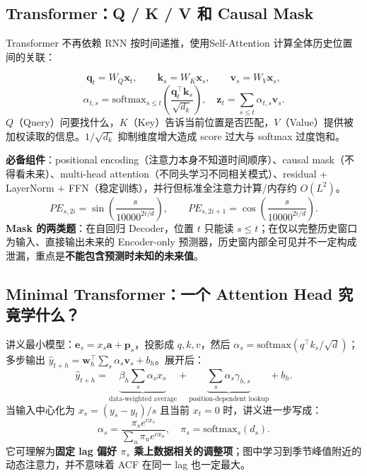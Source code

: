\documentclass[UTF8,fontset=fandol,10.5pt,a4paper]{ctexart}
\newcommand{\eng}[1]{{\sffamily\color{navy}#1}}
\newcommand{\formula}[1]{\[\boxed{#1}\]}
\begin{document}
\subsection{Transformer：Q / K / V 和 Causal Mask}
Transformer 不再依赖 RNN 按时间递推，使用\eng{Self-Attention} 计算全体历史位置间的关联：
\begin{keybox}
\[\mathbf q_t=W_Q\mathbf x_t,\qquad\mathbf k_s=W_K\mathbf x_s,\qquad\mathbf v_s=W_V\mathbf x_s,\]
\formula{\alpha_{t,s}=\mathrm{softmax}_{s\le t}\left(\frac{\mathbf q_t^\top\mathbf k_s}{\sqrt{d_k}}\right),\quad\mathbf z_t=\sum_{s\le t}\alpha_{t,s}\mathbf v_s.}
$Q$（Query）问要找什么，$K$（Key）告诉当前位置是否匹配，$V$（Value）提供被加权读取的信息。$1/\sqrt{d_k}$ 抑制维度增大造成 score 过大与 softmax 过度饱和。
\end{keybox}
\par\smallskip{}\par
\textbf{必备组件}：\eng{positional encoding}（注意力本身不知道时间顺序）、\eng{causal mask}（不得看未来）、\eng{multi-head attention}（不同头学习不同相关模式）、\eng{residual + LayerNorm + FFN}（稳定训练），并行但标准全注意力计算/内存约 $O(L^2)$。
\[PE_{s,2i}=\sin\left(\frac{s}{10000^{2i/d}}\right),\qquad PE_{s,2i+1}=\cos\left(\frac{s}{10000^{2i/d}}\right).\]
\textbf{Mask 的两类题}：在自回归 Decoder，位置 $t$ 只能读 $s\le t$；在仅以完整历史窗口为输入、直接输出未来的 Encoder-only 预测器，历史窗内部全可见并不一定构成泄漏，重点是\textbf{不能包含预测时未知的未来值}。
\subsection{Minimal Transformer：一个 Attention Head 究竟学什么？}
讲义最小模型：$\mathbf e_s=x_s\mathbf a+\mathbf p_s$，投影成 $q,k,v$，然后 $\alpha_s=\mathrm{softmax}(q^\top k_s/\sqrt d)$；多步输出 $\hat y_{t+h}=\mathbf w_h^\top\sum_s\alpha_s\mathbf v_s+b_h$。展开后：
\[\hat y_{t+h}=\underbrace{\beta_h\sum_s\alpha_s x_s}_{\text{data-weighted average}}+\underbrace{\sum_s\alpha_s\gamma_{h,s}}_{\text{position-dependent lookup}}+b_h.\]
当输入中心化为 $x_s=(y_s-y_t)/s$ 且当前 $x_t=0$ 时，讲义进一步写成：
\[\alpha_s=\frac{\pi_s e^{c x_s}}{\sum_u\pi_u e^{c x_u}},\quad\pi_s=\mathrm{softmax}_s(d_s).\]
它可理解为\textbf{固定 lag 偏好 $\pi_s$ 乘上数据相关的调整项}；图中学习到季节峰值附近的动态注意力，并不意味着 ACF 在同一 lag 也一定最大。
\par\smallskip{}\par\smallskip
\end{document}
